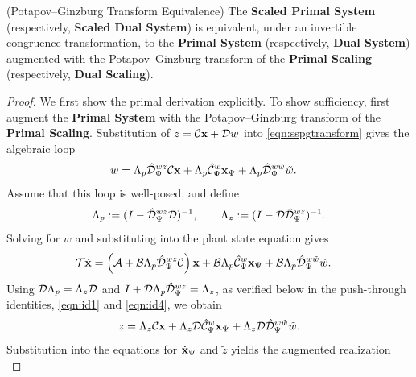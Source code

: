 \begin{lemma} (Potapov--Ginzburg Transform Equivalence)\label{lem:pgequivalence}
The \textbf{Scaled Primal System} (respectively, \textbf{Scaled Dual
System}) is equivalent, under an invertible congruence transformation,
to the \textbf{Primal System} (respectively, \textbf{Dual System})
augmented with the Potapov--Ginzburg transform of the \textbf{Primal
Scaling} (respectively, \textbf{Dual Scaling}).
\end{lemma}
\begin{proof}
    We first show the primal derivation explicitly. To show
    sufficiency, first augment the \textbf{Primal System} with the
    Potapov--Ginzburg transform of the \textbf{Primal Scaling}.
    Substitution of $z=\mathcal{C}\mathbf{x}+\mathcal{D}w$ into
    \eqref{eqn:sspgtransform} gives the algebraic loop
    \begin{align*}
        w
            &=
            \Lambda_p\hat{\mathcal{D}}_\Psi^{wz}\mathcal{C}\mathbf{x}
            +\Lambda_p\hat{\mathcal{C}}_\Psi^w\mathbf{x}_\Psi
            +\Lambda_p\hat{\mathcal{D}}_\Psi^{w\tilde{w}}\tilde{w}.
    \end{align*}
    Assume that this loop is well-posed, and define
    \begin{equation*}
        \Lambda_p := (I-\hat{\mathcal{D}}_\Psi^{wz}\mathcal{D})^{-1},
        \qquad
        \Lambda_z := (I-\mathcal{D}\hat{\mathcal{D}}_\Psi^{wz})^{-1}.
    \end{equation*}
    Solving for $w$ and substituting into the plant state equation gives
    \begin{align*}
        \mathcal{T}\dot{\mathbf{x}}
            &= \left(\mathcal{A}
                +\mathcal{B}\Lambda_p\hat{\mathcal{D}}_\Psi^{wz}\mathcal{C}\right)\mathbf{x}
               +\mathcal{B}\Lambda_p\hat{\mathcal{C}}_\Psi^w\mathbf{x}_\Psi
               +\mathcal{B}\Lambda_p\hat{\mathcal{D}}_\Psi^{w\tilde{w}}\tilde{w}.
    \end{align*}
    Using $\mathcal{D}\Lambda_p=\Lambda_z\mathcal{D}$ and
    $I+\mathcal{D}\Lambda_p\hat{\mathcal{D}}_\Psi^{wz}=\Lambda_z$, as verified
    below in the push-through identities, \eqref{eqn:id1} and \eqref{eqn:id4}, we obtain
    \begin{equation*}
        z
        =
        \Lambda_z\mathcal{C}\mathbf{x}
        +\Lambda_z\mathcal{D}\hat{\mathcal{C}}_\Psi^w\mathbf{x}_\Psi
        +\Lambda_z\mathcal{D}\hat{\mathcal{D}}_\Psi^{w\tilde{w}}\tilde{w}.
    \end{equation*}
    Substitution into the equations for $\dot{\mathbf{x}}_\Psi$ and
    $\tilde{z}$ yields the augmented realization
    \begin{equation}\label{eqn:potapov}

\end{equation}
\end{proof}
